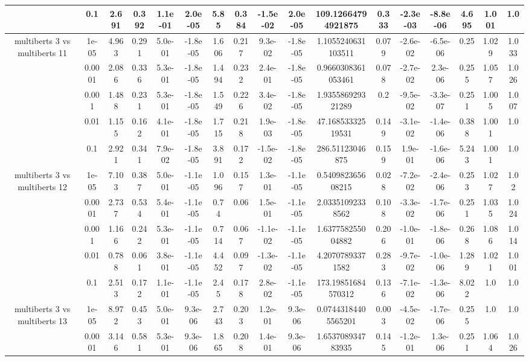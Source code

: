 \begin{tabular}{|c|c|c|c|c|c|c|c|c|c|c|c|c|c|c|c|c|}
 & 0.1 & 2.691 & 0.392 & 1.1e-01 & 2.0e-05 & 5.85 & 0.384 & -1.5e-02 & 2.0e-05 & 109.12664794921875 & 0.333 & -2.3e-03 & -8.8e-06 & 4.695 & 1.001 & 1.0 \\
\hline
\multirow{5}{*}{multiberts 3 vs multiberts 11} & 1e-05 & 4.963 & 0.291 & 5.0e-01 & -1.8e-05 & 1.606 & 0.217 & 9.3e-02 & -1.8e-05 & 1.1055240631103511 & 0.079 & -2.6e-02 & -6.5e-06 & 0.25 & 1.029 & 1.033 \\
 & 0.0001 & 2.086 & 0.336 & 5.3e-01 & -1.8e-05 & 1.494 & 0.232 & 2.4e-01 & -1.8e-05 & 0.9660308361053461 & 0.078 & -2.7e-02 & 2.3e-06 & 0.255 & 1.057 & 1.026 \\
 & 0.001 & 1.488 & 0.231 & 5.3e-01 & -1.8e-05 & 1.549 & 0.226 & 3.4e-02 & -1.8e-05 & 1.935586929321289 & 0.2 & -9.5e-02 & -3.3e-07 & 0.251 & 1.005 & 1.007 \\
 & 0.01 & 1.155 & 0.162 & 4.1e-01 & -1.8e-05 & 1.715 & 0.218 & 1.9e-03 & -1.8e-05 & 47.16853332519531 & 0.149 & -3.1e-02 & -1.4e-06 & 0.388 & 1.001 & 1.0 \\
 & 0.1 & 2.921 & 0.341 & 7.9e-02 & -1.8e-05 & 3.891 & 0.172 & -1.5e-02 & -1.8e-05 & 286.51123046875 & 0.159 & 1.9e-01 & -1.6e-06 & 5.243 & 1.001 & 1.0 \\
\hline
\multirow{5}{*}{multiberts 3 vs multiberts 12} & 1e-05 & 7.103 & 0.387 & 5.0e-01 & -1.1e-05 & 1.096 & 0.157 & 1.3e-01 & -1.1e-05 & 0.540982365608215 & 0.028 & -7.2e-02 & -2.4e-06 & 0.253 & 1.027 & 1.02 \\
 & 0.0001 & 2.737 & 0.534 & 5.4e-01 & -1.1e-05 & 0.74 & 0.06 & 1.5e-01 & -1.1e-05 & 2.03351092338562 & 0.108 & -3.3e-02 & -1.7e-06 & 0.251 & 1.035 & 1.024 \\
 & 0.001 & 1.166 & 0.242 & 5.3e-01 & -1.1e-05 & 0.714 & 0.067 & -1.1e-02 & -1.1e-05 & 1.637758255004882 & 0.206 & -1.0e-01 & -1.8e-06 & 0.268 & 1.086 & 1.014 \\
 & 0.01 & 0.788 & 0.061 & 3.8e-01 & -1.1e-05 & 4.452 & 0.097 & -1.3e-02 & -1.1e-05 & 4.20707893371582 & 0.283 & -9.7e-02 & -1.0e-06 & 1.289 & 1.021 & 1.001 \\
 & 0.1 & 2.513 & 0.172 & 1.1e-01 & -1.1e-05 & 2.45 & 0.178 & 2.8e-02 & -1.1e-05 & 173.19851684570312 & 0.136 & -7.1e-02 & -1.3e-06 & 8.022 & 1.0 & 1.0 \\
\hline
\multirow{5}{*}{multiberts 3 vs multiberts 13} & 1e-05 & 8.972 & 0.453 & 5.0e-01 & 9.3e-06 & 2.743 & 0.203 & 1.2e-01 & 9.3e-06 & 0.07443184405565201 & 0.003 & -4.5e-02 & -1.7e-06 & 0.255 & 1.0 & 1.0 \\
 & 0.0001 & 3.146 & 0.581 & 5.3e-01 & 9.3e-06 & 1.865 & 0.208 & 1.4e-01 & 9.3e-06 & 1.653708934783935 & 0.145 & -1.2e-01 & 1.3e-06 & 0.251 & 1.064 & 1.026 \\

\end{tabular}
